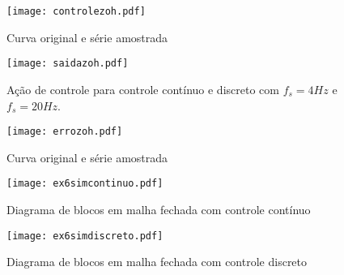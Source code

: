     \begin{figure}[H]
	\center
	\texttt{[image: controlezoh.pdf]}
	\caption{Curva original e série amostrada}
	\label{fig:ex6controle}
    \end{figure}

\newpage

    \begin{figure}[htp]
	\center
	\texttt{[image: saidazoh.pdf]}
	\caption{Ação de controle para controle contínuo e discreto com $f_s = 4 Hz$ e $f_s = 20 Hz$. }
	\label{fig:ex6saida}
    \end{figure}

    \begin{figure}[H]
	\center
	\texttt{[image: errozoh.pdf]}
	\caption{Curva original e série amostrada}
	\label{fig:ex6erro}
    \end{figure}
    
    \begin{figure}[H]
	\center
	\texttt{[image: ex6simcontinuo.pdf]}
	\caption{Diagrama de blocos em malha fechada com controle contínuo}
	\label{fig:ex6continuo}
    \end{figure}

    \begin{figure}[H]
	\center
	\texttt{[image: ex6simdiscreto.pdf]}
	\caption{Diagrama de blocos em malha fechada com controle discreto}
	\label{fig:ex6discreto}
    \end{figure}